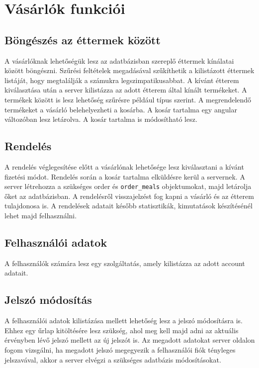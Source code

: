 \section{Vásárlók funkciói}

\subsection{Böngészés az éttermek között}

A vásárlóknak lehetőségük lesz az adatbázisban szereplő éttermek kínálatai között böngészni. Szűrési feltételek megadásával szűkíthetik a kilistázott éttermek listáját, hogy megtalálják a számukra legszimpatikusabbat.
A kívánt étterem kiválasztása után a server kilistázza az adott étterem által kínált termékeket. A termékek között is lesz lehetőség szűrésre például típus szerint. A megrendelendő termékeket a vásárló belehelyezheti a kosárba. A kosár tartalma egy angular változóban lesz letárolva. A kosár tartalma is módosítható lesz.

\subsection{Rendelés}

A rendelés véglegesítése előtt a vásárlónak lehetősége lesz kiválasztani a kívánt fizetési módot. Rendelés során a kosár tartalma elküldésre kerül a servernek. A server létrehozza a szükséges order és \texttt{order\_meals} objektumokat, majd letárolja őket az adatbázisban. A rendelésről visszajelzést fog kapni a vásárló és az étterem tulajdonosa is. A rendelések adatait később statisztikák, kimutatások készítésénél lehet majd felhasználni.

\subsection{Felhasználói adatok}

A felhasználók számára lesz egy szolgáltatás, amely kilistázza az adott account adatait.

\subsection{Jelszó módosítás}

A felhasználói adatok kilistázása mellett lehetőség lesz a jelszó módosításra is. Ehhez egy űrlap kitöltésére lesz szükség, ahol meg kell majd adni az aktuális érvényben lévő jelszó mellett az új jelszót is. Az megadott adatokat server oldalon fogom vizsgálni, ha megadott jelszó megegyezik a felhasználói fiók tényleges jelszavával, akkor a server elvégzi a szükséges adatbázis módosításokat.

